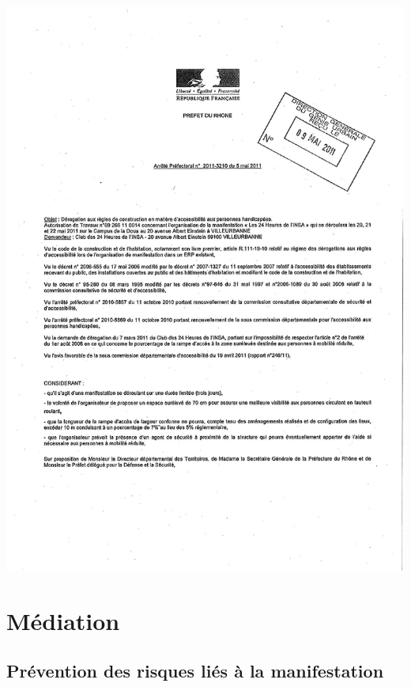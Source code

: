 \documentclass[hidelinks, paper=a4, fontsize=13pt]{report}
\begin{document}
\begin{center}
\includegraphics[scale=0.7]{images/arretePrefPMR}
\end{center}



\chapter{Médiation}
\section{Prévention des risques liés à la manifestation}
\end{document}
